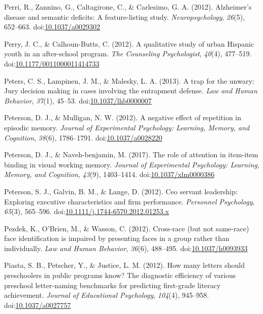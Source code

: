 \documentclass[english,man]{apa6}
\theoremstyle{definition}
\theoremstyle{definition}
\theoremstyle{definition}
\theoremstyle{remark}
\begin{document}
\hypertarget{ref-Perri2012}{}
Perri, R., Zannino, G., Caltagirone, C., \& Carlesimo, G. A. (2012).
Alzheimer's disease and semantic deficits: A feature-listing study.
\emph{Neuropsychology}, \emph{26}(5), 652--663.
doi:\href{https://doi.org/10.1037/a0029302}{10.1037/a0029302}

\hypertarget{ref-Perry2012}{}
Perry, J. C., \& Calhoun-Butts, C. (2012). A qualitative study of urban
Hispanic youth in an after-school program. \emph{The Counseling
Psychologist}, \emph{40}(4), 477--519.
doi:\href{https://doi.org/10.1177/0011000011414733}{10.1177/0011000011414733}

\hypertarget{ref-Peters2013}{}
Peters, C. S., Lampinen, J. M., \& Malesky, L. A. (2013). A trap for the
unwary: Jury decision making in cases involving the entrapment defense.
\emph{Law and Human Behavior}, \emph{37}(1), 45--53.
doi:\href{https://doi.org/10.1037/lhb0000007}{10.1037/lhb0000007}

\hypertarget{ref-Peterson2012}{}
Peterson, D. J., \& Mulligan, N. W. (2012). A negative effect of
repetition in episodic memory. \emph{Journal of Experimental Psychology:
Learning, Memory, and Cognition}, \emph{38}(6), 1786--1791.
doi:\href{https://doi.org/10.1037/a0028220}{10.1037/a0028220}

\hypertarget{ref-Peterson2017}{}
Peterson, D. J., \& Naveh-benjamin, M. (2017). The role of attention in
item-item binding in visual working memory. \emph{Journal of
Experimental Psychology: Learning, Memory, and Cognition}, \emph{43}(9),
1403--1414.
doi:\href{https://doi.org/10.1037/xlm0000386}{10.1037/xlm0000386}

\hypertarget{ref-Peterson2012a}{}
Peterson, S. J., Galvin, B. M., \& Lange, D. (2012). Ceo servant
leadership: Exploring executive characteristics and firm performance.
\emph{Personnel Psychology}, \emph{65}(3), 565--596.
doi:\href{https://doi.org/10.1111/j.1744-6570.2012.01253.x}{10.1111/j.1744-6570.2012.01253.x}

\hypertarget{ref-Pezdek2012}{}
Pezdek, K., O'Brien, M., \& Wasson, C. (2012). Cross-race (but not
same-race) face identification is impaired by presenting faces in a
group rather than individually. \emph{Law and Human Behavior},
\emph{36}(6), 488--495.
doi:\href{https://doi.org/10.1037/h0093933}{10.1037/h0093933}

\hypertarget{ref-Piasta2012}{}
Piasta, S. B., Petscher, Y., \& Justice, L. M. (2012). How many letters
should preschoolers in public programs know? The diagnostic efficiency
of various preschool letter-naming benchmarks for predicting first-grade
literacy achievement. \emph{Journal of Educational Psychology},
\emph{104}(4), 945--958.
doi:\href{https://doi.org/10.1037/a0027757}{10.1037/a0027757}
\end{document}
